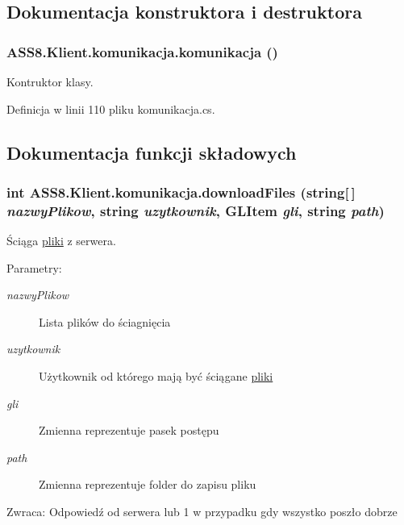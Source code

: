 \subsection{Dokumentacja konstruktora i destruktora}
\hypertarget{a00013_178f432b69d8d6f2c1d6b8f6d1c43eb9}{
\subsubsection[{komunikacja}]{\setlength{\rightskip}{0pt plus 5cm}ASS8.Klient.komunikacja.komunikacja ()}}
\label{d7/dd4/a00013_178f432b69d8d6f2c1d6b8f6d1c43eb9}


Kontruktor klasy. 



Definicja w linii 110 pliku komunikacja.cs.

\subsection{Dokumentacja funkcji składowych}
\hypertarget{a00013_d93f81514442cd3a5eeea0db9b1c9148}{
\subsubsection[{downloadFiles}]{\setlength{\rightskip}{0pt plus 5cm}int ASS8.Klient.komunikacja.downloadFiles (string\mbox{[}$\,$\mbox{]} {\em nazwyPlikow}, \/  string {\em uzytkownik}, \/  GLItem {\em gli}, \/  string {\em path})}}
\label{d7/dd4/a00013_d93f81514442cd3a5eeea0db9b1c9148}


Ściąga \hyperlink{a00017}{pliki} z serwera. 

\begin{Desc}
\item[Parametry:]
\begin{description}
\item[{\em nazwyPlikow}]Lista plików do ściagnięcia\item[{\em uzytkownik}]Użytkownik od którego mają być ściągane \hyperlink{a00017}{pliki}\item[{\em gli}]Zmienna reprezentuje pasek postępu\item[{\em path}]Zmienna reprezentuje folder do zapisu pliku\end{description}
\end{Desc}
\begin{Desc}
\item[Zwraca:]Odpowiedź od serwera lub 1 w przypadku gdy wszystko poszło dobrze\end{Desc}



